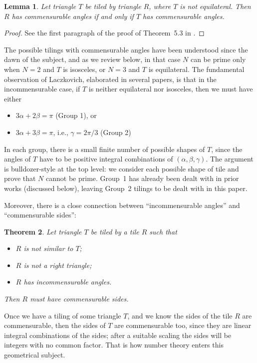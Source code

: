 \documentclass{amsart}
\theoremstyle{plain}
\newtheorem{theorem}{Theorem}
\newtheorem{lemma}[theorem]{Lemma}
\theoremstyle{definition}
\theoremstyle{remark}
\begin{document}
 \begin{lemma} \label{lemma:RandT} 
 Let triangle $T$ be tiled by triangle $R$, where $T$ is not equilateral. Then $R$ has 
commensurable angles if and only if $T$ has commensurable angles.
\end{lemma}
\begin{proof} See the first paragraph of the proof of Theorem~5.3 in \cite{laczkovich1995}.
\end{proof}



The possible tilings with commensurable angles have been understood since the dawn
of the subject, and as we review below, in that case $N$ can be prime only when 
$N=2$ and $T$ is isosceles, or $N=3$ and $T$ is equilateral.  The fundamental 
observation of Laczkovich, elaborated in several papers, is that in the incommensurable case,
if $T$ is neither equilateral nor isosceles, then
we must have either 
\begin{itemize}
\item $3\alpha+2\beta = \pi$   \hskip3.1cm(Group 1), or 
\item $3\alpha + 3 \beta = \pi$,  i.e., $\gamma = 2\pi/3$  \hskip0.8cm(Group 2)
\end{itemize}
In each group,  there is a small finite number of possible shapes of $T$, since the 
angles of $T$ have to be positive integral combinations of $(\alpha,\beta,\gamma)$.
The argument is bulldozer-style at the top level:  we consider each possible shape
of tile and prove that $N$ cannot be prime.  Group~1 has already been dealt 
with in prior works (discussed below),  leaving Group~2 tilings to be dealt 
with in this paper.

Moreover, there is a close connection between ``incommensurable angles'' and 
``commensurable sides'':
\begin{theorem}\cite[Theorem 1.2]{beeson-zhang2026}
    \label{theorem:rationality}
 Let triangle $T$ be tiled by a tile $R$ such that
    \begin{itemize}
        \item $R$ is not similar to $T$;
        \item $R$ is not a right triangle;
        \item $R$ has incommensurable angles.
    \end{itemize}
    Then $R$ must have commensurable sides.
\end{theorem}

Once we have a tiling of some triangle $T$, and we know the sides of the tile $R$
are commensurable, then the sides of $T$ are commensurable too, since they are linear
integral combinations of the sides; after a suitable scaling the sides will be 
integers with no common factor.  That is how number theory enters this geometrical subject.
\end{document}

